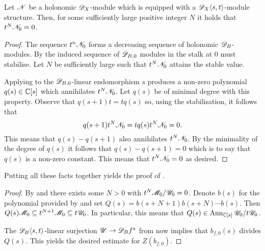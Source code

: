 \begin{proposition}\label{prop: StableZero}
  Let $\mathscr{N}$ be a holonomic $\mathscr{D}_X$-module which is equipped with a $\mathscr{D}_X\langle s,t\rangle$-module structure. 
  Then, for some sufficiently large positive integer $N$ it holds that $t^N \mathscr{N}_0 = 0$.
\end{proposition}
\begin{proof}
  The sequence $t^n \mathscr{N}_0$ forms a decreasing sequence of holonomic $\mathscr{D}_B$-modules.
  By  the induced sequence of $\mathscr{D}_{B,0}$ modules in the stalk at $0$ must stabilise.
  Let $N$ be sufficiently large such that $t^N\mathscr{N}_0$ attains the stable value.

  Applying  to the $\mathscr{D}_{B,0}$-linear endomorphism $s$ produces a non-zero polynomial $q(s)\in \mathbb{C}[s]$ which annihilates $t^N\mathscr{N}_0$.
  Let $q(s)$ be of minimal degree with this property.
  Observe that $q(s+1)t = tq(s)$ so, using the stabilisation, it follows that
  $$q(s+1)t^N\mathscr{N}_0 = t q(s) t^N\mathscr{N}_0 = 0.$$
  This means that $q(s) - q(s+1)$ also annihilates $t^N\mathscr{N}_0$.
  By the minimality of the degree of $q(s)$ it follows that $q(s) - q(s+1)=0$ which is to say that $q(s)$ is a non-zero constant.
  This means that $t^N\mathscr{N}_0 = 0 $ as desired.
\end{proof}
Putting all these facts together yields the proof of .
\begin{proof}
  By  and  there exists some $N>0$ with $t^N \mathscr{M}_0/\mathscr{U}_0 = 0$.
  Denote $b(s)$ for the polynomial provided by 
  and set $Q(s) = b(s+N+1)b(s+N)\cdots b(s)$. 
  Then $Q(s)\mathscr{M}_0 \subseteq t^{N+1}\mathscr{M}_0 \subseteq t\mathscr{U}_0$.
  In particular, this means that $Q(s) \in \operatorname{Ann}_{\mathbb{C}[s]} \mathscr{U}_0 / t\mathscr{U}_0$.

  The $\mathscr{D}_B\langle s,t\rangle$-linear surjection $\mathscr{U} \to \mathscr{D}_B f^s$ from  now implies that $b_{f,0}(s)$ divides $Q(s)$.
  This yields the desired estimate for $Z(b_{f,0})$.
\end{proof}

